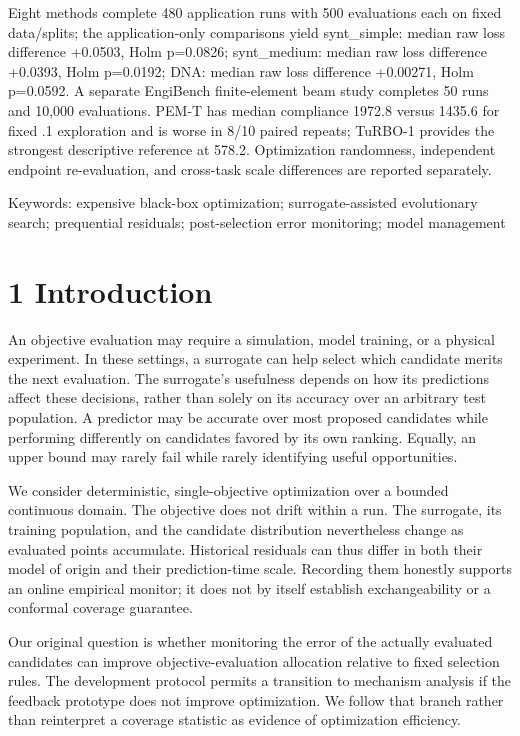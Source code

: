 \documentclass[11pt,a4paper]{article}
\begin{document}
Eight methods complete 480 application runs with 500 evaluations each on
fixed data/splits; the application-only comparisons yield synt\_simple:
median raw loss difference +0.0503, Holm p=0.0826; synt\_medium: median
raw loss difference +0.0393, Holm p=0.0192; DNA: median raw loss
difference +0.00271, Holm p=0.0592. A separate EngiBench finite-element
beam study completes 50 runs and 10,000 evaluations. PEM-T has median
compliance 1972.8 versus 1435.6 for fixed .1 exploration and is worse in
8/10 paired repeats; TuRBO-1 provides the strongest descriptive
reference at 578.2. Optimization randomness, independent endpoint
re-evaluation, and cross-task scale differences are reported separately.

Keywords: expensive black-box optimization; surrogate-assisted
evolutionary search; prequential residuals; post-selection error
monitoring; model management

\hypertarget{introduction}{%
\section{1 Introduction}\label{introduction}}

An objective evaluation may require a simulation, model training, or a
physical experiment. In these settings, a surrogate can help select
which candidate merits the next evaluation. The surrogate's usefulness
depends on how its predictions affect these decisions, rather than
solely on its accuracy over an arbitrary test population. A predictor
may be accurate over most proposed candidates while performing
differently on candidates favored by its own ranking. Equally, an upper
bound may rarely fail while rarely identifying useful opportunities.

We consider deterministic, single-objective optimization over a bounded
continuous domain. The objective does not drift within a run. The
surrogate, its training population, and the candidate distribution
nevertheless change as evaluated points accumulate. Historical residuals
can thus differ in both their model of origin and their prediction-time
scale. Recording them honestly supports an online empirical monitor; it
does not by itself establish exchangeability or a conformal coverage
guarantee.

Our original question is whether monitoring the error of the actually
evaluated candidates can improve objective-evaluation allocation
relative to fixed selection rules. The development protocol permits a
transition to mechanism analysis if the feedback prototype does not
improve optimization. We follow that branch rather than reinterpret a
coverage statistic as evidence of optimization efficiency.
\end{document}
